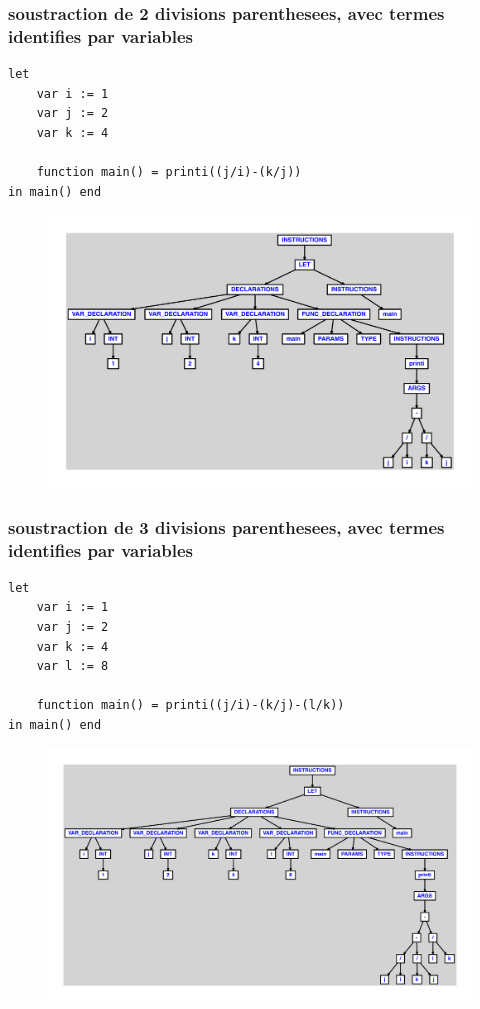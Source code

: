 \documentclass{article}
\begin{document}
\subsubsection{soustraction de 2 divisions parenthesees, avec termes identifies par variables}
\begin{lstlisting}
let
	var i := 1
	var j := 2
	var k := 4

	function main() = printi((j/i)-(k/j))
in main() end
\end{lstlisting}
\newpage
\begin{figure}[H]
\centering
\includegraphics[max width=\textwidth]{ast/ast_133.pdf}
\end{figure}
\newpage
\subsubsection{soustraction de 3 divisions parenthesees, avec termes identifies par variables}
\begin{lstlisting}
let
	var i := 1
	var j := 2
	var k := 4
	var l := 8

	function main() = printi((j/i)-(k/j)-(l/k))
in main() end
\end{lstlisting}
\newpage
\begin{figure}[H]
\centering
\includegraphics[max width=\textwidth]{ast/ast_134.pdf}
\end{figure}
\newpage
\end{document}

